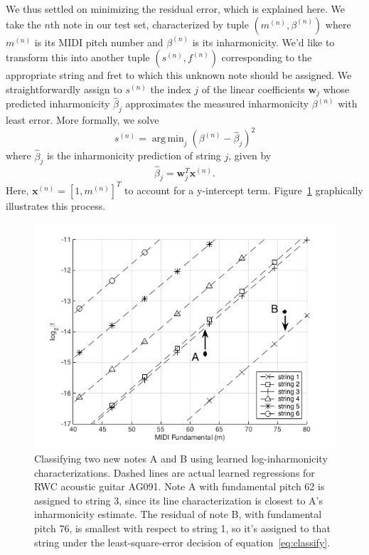 \documentclass[12pt]{cmuthesis}
\DeclareMathOperator*{\argmin}{arg\,min}
\begin{document}
We thus settled on minimizing the residual error, which is explained here. We take the $n$th note in our test set, characterized by tuple $(m^{(n)},\beta^{(n)})$ where $m^{(n)}$ is its MIDI pitch number and $\beta^{(n)}$ is its inharmonicity. We'd like to transform this into another tuple $(s^{(n)},f^{(n)})$ corresponding to the appropriate string and fret to which this unknown note should be assigned. We straightforwardly assign to $s^{(n)}$ the index $j$ of the linear coefficients $\mathbf{w}_j$ whose predicted inharmonicity $\hat\beta_j$ approximates the measured inharmonicity $\beta^{(n)}$ with least error. More formally, we solve 
\begin{equation}
\label{eq:classify}
s^{(n)} = \argmin_{j}{(\beta^{(n)} - \hat{\beta}_{j})^2}
\end{equation}
where $\hat\beta_j$ is the inharmonicity prediction of string $j$, given by
\begin{equation}
\hat{\beta}_{j} = \mathbf{w}_{j}^T\mathbf{x}^{(n)}.
\end{equation}
Here, $\mathbf{x}^{(n)} = [1, m^{(n)}]^T$ to account for a y-intercept term. Figure~\ref{fig:classify} graphically illustrates this process.

\begin{figure}[!htbp] 
\label{fig:classify}
\centering
\includegraphics[scale=0.75]{classify}
\caption{Classifying two new notes A and B using learned log-inharmonicity characterizations. Dashed lines are actual learned regressions for RWC acoustic guitar AG091. Note A with fundamental pitch 62 is assigned to string 3, since its line characterization is closest to A's inharmonicity estimate. The residual of note B, with fundamental pitch 76, is smallest with respect to string 1, so it's assigned to that string under the least-square-error decision of equation~\eqref{eq:classify}.}
\end{figure}
\end{document}
